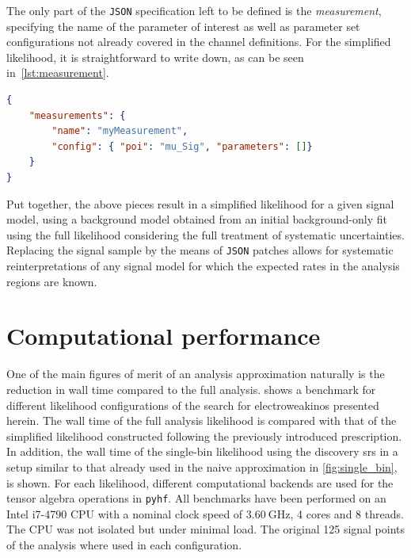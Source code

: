 The only part of the \texttt{JSON} specification left to be defined is the \textit{measurement}, specifying the name of the parameter of interest as well as parameter set configurations not already covered in the channel definitions. For the simplified likelihood, it is straightforward to write down, as can be seen in~\cref{lst:measurement}.

\begin{minipage}{\linewidth}
\begin{lstlisting}[language=json,firstnumber=1,caption={Example of a measurement in the simplified likelihood. The signal strength is the parameter of interest, no additional parameters need further configuration.},captionpos=b, label=lst:measurement]
{
	"measurements": {
		"name": "myMeasurement",
		"config": { "poi": "mu_Sig", "parameters": []}
	}	
}
\end{lstlisting}
\end{minipage}

Put together, the above pieces result in a simplified likelihood for a given signal model, using a background model obtained from an initial background-only fit using the full likelihood considering the full treatment of systematic uncertainties. Replacing the signal sample by the means of \texttt{JSON} patches allows for systematic reinterpretations of any signal model for which the expected rates in the analysis regions are known.  


\section{Computational performance}\label{sec:cpu_performance}

One of the main figures of merit of an analysis approximation naturally is the reduction in wall time compared to the full analysis.  shows a benchmark for different likelihood configurations of the search for electroweakinos presented herein. The wall time of the full analysis likelihood is compared with that of the simplified likelihood constructed following the previously introduced prescription. In addition, the wall time of the single-bin likelihood using the discovery \glspl{sr} in a setup similar to that already used in the naive approximation in \cref{fig:single_bin}, is shown. For each likelihood, different computational backends are used for the tensor algebra operations in \texttt{pyhf}. All benchmarks have been performed on an Intel i7-4790 CPU with a nominal clock speed of $\SI{3.60}{\GHz}$, 4 cores and 8 threads. The CPU was not isolated but under minimal load. The original 125 signal points of the analysis where used in each configuration.

